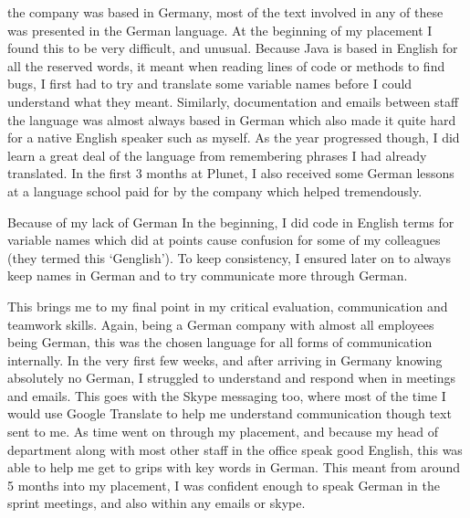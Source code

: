 \documentclass[12pt]{article}
\begin{document}
the company was based in Germany, most of the text involved in any of these was presented in the German language. At the
beginning of my placement I found this to be very difficult, and unusual. Because Java is based in English for all the
reserved words, it meant when reading lines of code or methods to find bugs, I first had to try and translate some
variable names before I could understand what they meant. Similarly, documentation and emails between staff the language
was almost always based in German which also made it quite hard for a native English speaker such as myself. As the year
progressed though, I did learn a great deal of the language from remembering phrases I had already translated. In the
first 3 months at Plunet, I also received some German lessons at a language school paid for by the company which helped
tremendously.\\ \par \noindent
Because of my lack of German In the beginning, I did code in English terms for variable names which did at points cause
confusion for some of my colleagues (they termed this ‘Genglish’). To keep consistency, I ensured later on to always
keep names in German and to try communicate more through German.\\ \par \noindent
This brings me to my final point in my critical evaluation, communication and teamwork skills. Again, being a German
company with almost all employees being German, this was the chosen language for all forms of communication internally.
In the very first few weeks, and after arriving in Germany knowing absolutely no German, I struggled to understand and
respond when in meetings and emails. This goes with the Skype messaging too, where most of the time I would use Google
Translate to help me understand communication though text sent to me. As time went on through my placement, and because
my head of department along with most other staff in the office speak good English, this was able to help me get to
grips with key words in German. This meant from around 5 months into my placement, I was confident enough to speak
German in the sprint meetings, and also within any emails or skype.


\end{document}
